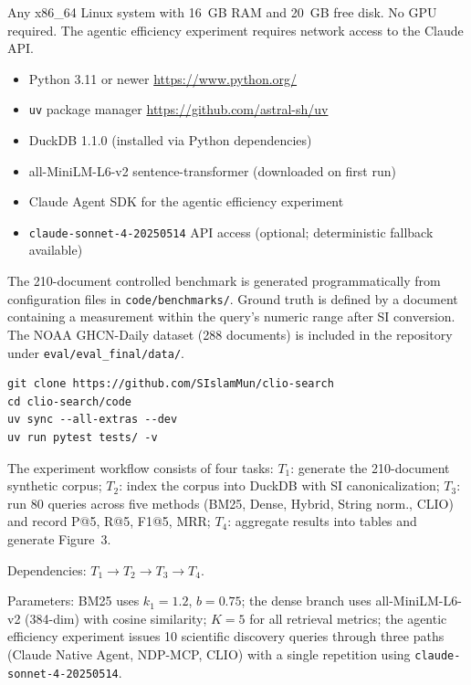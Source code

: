 \documentclass[conference]{IEEEtran}
\begin{document}
\artin


Any x86\_64 Linux system with 16~GB RAM and 20~GB free disk. No GPU required. The agentic efficiency experiment requires network access to the Claude API.


\begin{itemize}
\item Python 3.11 or newer \url{https://www.python.org/}
\item \texttt{uv} package manager \url{https://github.com/astral-sh/uv}
\item DuckDB 1.1.0 (installed via Python dependencies)
\item all-MiniLM-L6-v2 sentence-transformer (downloaded on first run)
\item Claude Agent SDK for the agentic efficiency experiment
\item \texttt{claude-sonnet-4-20250514} API access (optional; deterministic fallback available)
\end{itemize}


The 210-document controlled benchmark is generated programmatically from configuration files in \texttt{code/benchmarks/}. Ground truth is defined by a document containing a measurement within the query's numeric range after SI conversion. The NOAA GHCN-Daily dataset (288 documents) is included in the repository under \texttt{eval/eval\_final/data/}.


\begin{verbatim}
git clone https://github.com/SIslamMun/clio-search
cd clio-search/code
uv sync --all-extras --dev
uv run pytest tests/ -v
\end{verbatim}

\artcomp

The experiment workflow consists of four tasks:
$T_1$: generate the 210-document synthetic corpus;
$T_2$: index the corpus into DuckDB with SI canonicalization;
$T_3$: run 80 queries across five methods (BM25, Dense, Hybrid, String norm., CLIO) and record P@5, R@5, F1@5, MRR;
$T_4$: aggregate results into tables and generate Figure~3.

Dependencies: $T_1 \rightarrow T_2 \rightarrow T_3 \rightarrow T_4$.

Parameters: BM25 uses $k_1{=}1.2$, $b{=}0.75$; the dense branch uses all-MiniLM-L6-v2 (384-dim) with cosine similarity; $K{=}5$ for all retrieval metrics; the agentic efficiency experiment issues 10 scientific discovery queries through three paths (Claude Native Agent, NDP-MCP, CLIO) with a single repetition using \texttt{claude-sonnet-4-20250514}.
\end{document}
